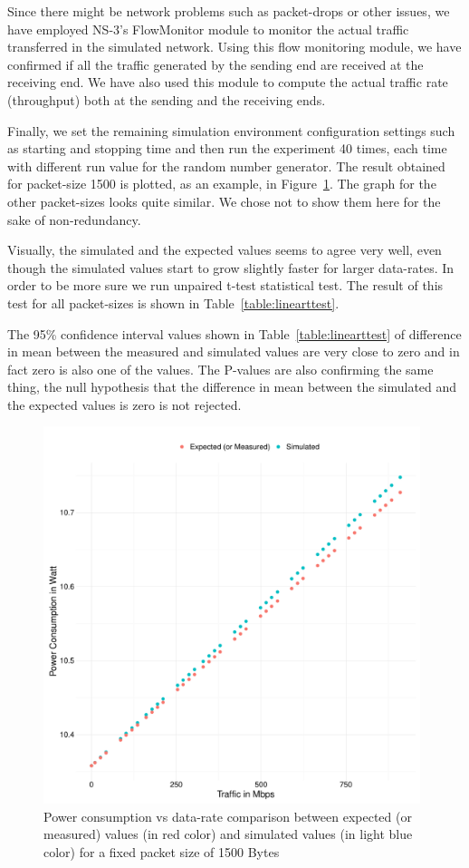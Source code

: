 Since there might be network problems such as packet-drops or other issues, we have employed NS-3's FlowMonitor module to monitor the actual traffic transferred in the simulated network. Using this flow monitoring module, we have confirmed if all the traffic generated by the sending end are received at the receiving end. We have also used this module to compute the actual traffic rate (throughput) both at the sending and the receiving ends.

Finally, we set the remaining simulation environment configuration settings such as starting and stopping time and then run the experiment 40 times, each time with different run value for the random number generator. The result obtained for packet-size 1500 is plotted, as an example, in Figure~\ref{fig:linear}. The graph for the other packet-sizes looks quite similar. We chose not to show them here for the sake of non-redundancy. 

Visually, the simulated and the expected values seems to agree very well, even though the simulated values start to grow slightly faster for larger data-rates. In order to be more sure we run unpaired t-test statistical test. The result of this test for all packet-sizes is shown in Table~\ref{table:linearttest}. 

The 95\% confidence interval values shown in Table~\ref{table:linearttest} of difference in mean between the measured and simulated values are very close to zero and in fact zero is also one of the values. The P-values are also confirming the same thing, the null hypothesis that the difference in mean between the simulated and the expected values is zero is not rejected. 

\begin{figure}[ht]
	\begin{center}
		\includegraphics[width=11cm]{images/simulatedvsexpectedlinear.pdf}
		\caption{Power consumption vs data-rate comparison between expected (or measured) values (in red color) and simulated values (in light blue color) for a fixed packet size of 1500 Bytes}
		\label{fig:linear}
	\end{center}
\end{figure}

